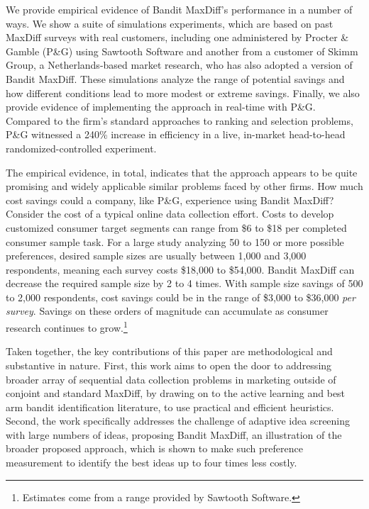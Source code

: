 \documentclass[nonblindrev]{informs3}
\begin{document}
We provide empirical evidence of Bandit MaxDiff's performance in a number of ways. We show a suite of simulations experiments, which are based on past MaxDiff surveys with real customers, including one administered by Procter \& Gamble (P\&G) using Sawtooth Software \citep{fairchildetal2015banditmaxdiff} and another from a customer of Skimm Group, a Netherlands-based market research, who has also adopted a version of Bandit MaxDiff. These simulations analyze the range of potential savings and how different conditions lead to more modest or extreme savings. Finally, we also provide evidence of implementing the approach in real-time with P\&G. Compared to the firm's standard approaches to ranking and selection problems, P\&G witnessed a 240\% increase in efficiency in a live, in-market head-to-head randomized-controlled experiment.

The empirical evidence, in total, indicates that the approach appears to be quite promising and widely applicable similar problems faced by other firms. How much cost savings could a company, like P\&G, experience using Bandit MaxDiff? Consider the cost of a typical online data collection effort. Costs to develop customized consumer target segments can range from \$6 to \$18 per completed consumer sample task. For a large study analyzing 50 to 150 or more possible preferences, desired sample sizes are usually between 1,000 and 3,000 respondents, meaning each survey costs \$18,000 to \$54,000. Bandit MaxDiff can decrease the required sample size by 2 to 4 times. With sample size savings of 500 to 2,000 respondents, cost savings could be in the range of \$3,000 to \$36,000 \emph{per survey}. Savings on these orders of magnitude can accumulate as consumer research continues to grow.\footnote{Estimates come from a range provided by Sawtooth Software.}

Taken together, the key contributions of this paper are methodological and substantive in nature. First, this work aims to open the door to addressing broader array of sequential data collection problems in marketing outside of conjoint and standard MaxDiff, by drawing on to the active learning and best arm bandit identification literature, to use practical and efficient heuristics. Second, the work specifically addresses the challenge of adaptive idea screening with large numbers of ideas, proposing Bandit MaxDiff, an illustration of the broader proposed approach, which is shown to make such preference measurement to identify the best ideas up to four times less costly.
\end{document}
